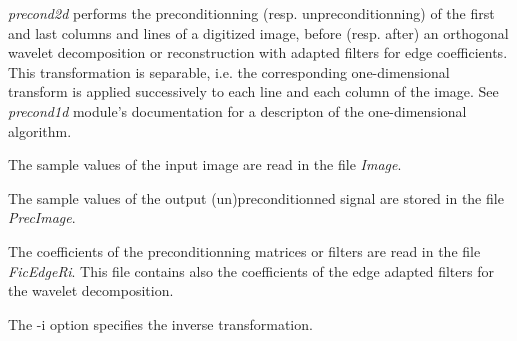 {\em precond2d} performs the preconditionning (resp. unpreconditionning) of the first and last columns and lines of a digitized image, before (resp. after) an orthogonal wavelet decomposition or reconstruction 
with adapted filters for edge coefficients. 
This transformation is separable, i.e. the corresponding one-dimensional transform is applied successively to each line and each column of the image. 
See {\em precond1d} module's documentation for a descripton of the one-dimensional algorithm. 

The sample values of the input image are read in the file {\em Image}.

The sample values of the output (un)preconditionned signal are stored in the file {\em PrecImage}.

The coefficients of the preconditionning matrices or filters are read in the file {\em FicEdgeRi}. This file contains also the coefficients of the edge adapted filters for the wavelet decomposition.

The -i option specifies the inverse transformation.

